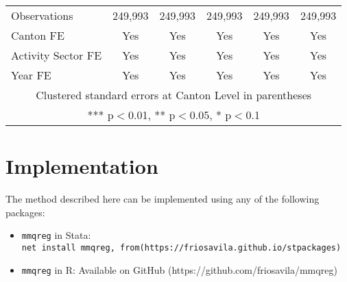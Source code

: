\documentclass[
  12pt,
  oneside]{article}
\providecommand{\tightlist}{%
  \setlength{\itemsep}{0pt}\setlength{\parskip}{0pt}}\usepackage{longtable,booktabs,array}
\begin{document}
\begin{table}[H]
{\begin{tabular}{lccccc}
     &  &  &  &  &  \\ \hline
    Observations & 249,993 & 249,993 & 249,993 & 249,993 & 249,993 \\
    Canton FE & Yes & Yes & Yes & Yes & Yes \\
    Activity Sector FE & Yes & Yes & Yes & Yes & Yes \\
    Year FE & Yes & Yes & Yes & Yes & Yes \\ \hline
    \multicolumn{6}{c}{ Clustered standard errors at Canton Level in parentheses} \\
    \multicolumn{6}{c}{ *** p$<$0.01, ** p$<$0.05, * p$<$0.1} \\
    \end{tabular}

}

\end{table}%

\section{Implementation}\label{implementation}

The method described here can be implemented using any of the following
packages:

\begin{itemize}
\tightlist
\item
  \texttt{mmqreg} in Stata:
  \texttt{net\ install\ mmqreg,\ from(https://friosavila.github.io/stpackages)}
\item
  \texttt{mmqreg} in R: Available on GitHub
  (https://github.com/friosavila/mmqreg)
\end{itemize}
\end{document}
